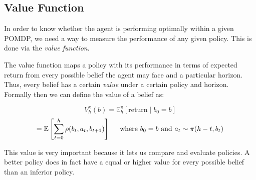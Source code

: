%
%
%

\subsection{Value Function}

In order to know whether the agent is performing optimally within a given POMDP, we need a way to measure
the performance of any given policy. This is done via the \textit{value function}.

The value function maps a policy with its performance in terms of expected return from every
possible belief the agent may face and a particular horizon. Thus, every belief has a certain
\textit{value} under a certain policy and horizon. Formally then we can define the value of a belief
as:

\[ V^\pi_{h}(b) = \mathbb{E}^\pi_h \left [\text{return} \mid b_0 = b \right ] \]
\[ = \mathbb{E} \left [\sum_{t=0}^{h} \rho(b_{t}, a_t, b_{t+1}) \right ]
    \hspace{0.5cm}\text{where }b_0 = b \text{ and }a_t \sim \pi(h-t, b_t) \]

This value is very important because it lets us compare and evaluate policies. A better policy does
in fact have a equal or higher value for every possible belief than an inferior policy.

